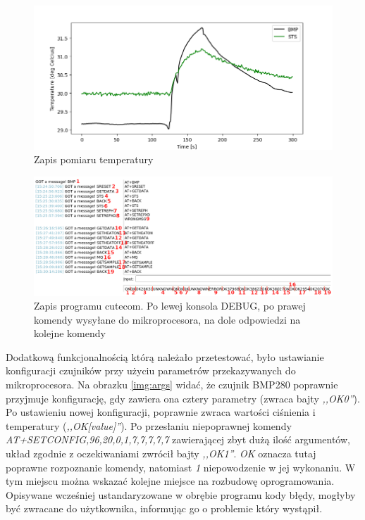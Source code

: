 \begin{figure}[H]
    \centering
    \includegraphics[width=\textwidth, height=\textheight, keepaspectratio]{../Test/Figure_1.png}
    \caption{Zapis pomiaru temperatury}
    \label{img:wykresik}
\end{figure}

\begin{figure}[H]
    \centering
    \includegraphics[width=\textwidth, height=\textheight, keepaspectratio]{Graphics/logs.png}
    \caption{Zapis programu cutecom. Po lewej konsola DEBUG, po prawej komendy wysyłane do mikroprocesora, na dole odpowiedzi na kolejne komendy}
    \label{img:cutecom}
\end{figure}

Dodatkową funkcjonalnością którą należało przetestować, było ustawianie konfiguracji czujników przy użyciu parametrów przekazywanych do mikroprocesora. Na obrazku \ref{img:args} widać, że czujnik BMP280 poprawnie przyjmuje konfigurację, gdy zawiera ona cztery parametry (zwraca bajty \textit{,,OK0''}). Po ustawieniu nowej konfiguracji, poprawnie zwraca wartości ciśnienia i temperatury (\textit{,,OK[value]''}). Po przesłaniu niepoprawnej komendy \textit{AT+SETCONFIG,96,20,0,1,7,7,7,7,7} zawierającej zbyt dużą ilość argumentów, układ zgodnie z oczekiwaniami zwrócił bajty \textit{,,OK1''}. \textit{OK} oznacza tutaj poprawne rozpoznanie komendy, natomiast \textit{1} niepowodzenie w jej wykonaniu. W tym miejscu można wskazać kolejne miejsce na rozbudowę oprogramowania. Opisywane wcześniej ustandaryzowane w obrębie programu kody błędy, mogłyby być zwracane do użytkownika, informując go o problemie który wystąpił.

